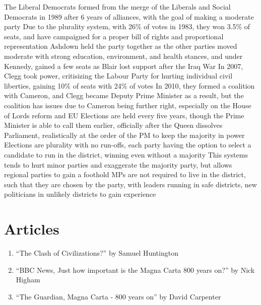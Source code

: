 \documentclass[11 pt, twoside]{article}
\newenvironment{outline*}
{
	\begin{outline}[enumerate]
	}
	{\end{outline}
}
\begin{document}
\begin{outline*}
\3 %
\2 The Liberal Democrats formed from the merge of the Liberals and Social Democrats in 1989 after 6 years of alliances, with the goal of making a moderate party
\3 Due to the plurality system, with 26\% of votes in 1983, they won 3.5\% of seats, and have campaigned for a proper bill of rights and proportional representation
\3 Ashdown held the party together as the other parties moved moderate with strong education, environment, and health stances, and under Kennedy, gained a few seats as Blair lost support after the Iraq War
\3 In 2007, Clegg took power, critisizing the Labour Party for hurting individual civil liberties, gaining 10\% of seats with 24\% of votes
\3 In 2010, they formed a coalition with Cameron, and Clegg became Deputy Prime Minister as a result, but the coalition has issues due to Cameron being further right, especially on the House of Lords reform and EU
\1 Elections are held every five years, though the Prime Minister is able to call them earlier, officially after the Queen dissolves Parliament, realistically at the order of the PM to keep the majority in power
\2 Elections are plurality with no run-offs, each party having the option to select a candidate to run in the district, winning even without a majority
\3 This systems tends to hurt minor parties and exaggerate the majority party, but allows regional parties to gain a foothold
\2 MPs are not required to live in the district, such that they are chosen by the party, with leaders running in safe districts, new politicians in unlikely districts to gain experience
\end{outline*}
\section{Articles}
\begin{enumerate}
\item \hypertarget{1}{``The Clash of Civilizations?'' by Samuel Huntington}
\item \hypertarget{2}{``BBC News, Just how important is the Magna Carta 800 years on?'' by Nick Higham}
\item \hypertarget{3}{``The Guardian, Magna Carta - 800 years on'' by David Carpenter}
\end{enumerate}
\end{document}
